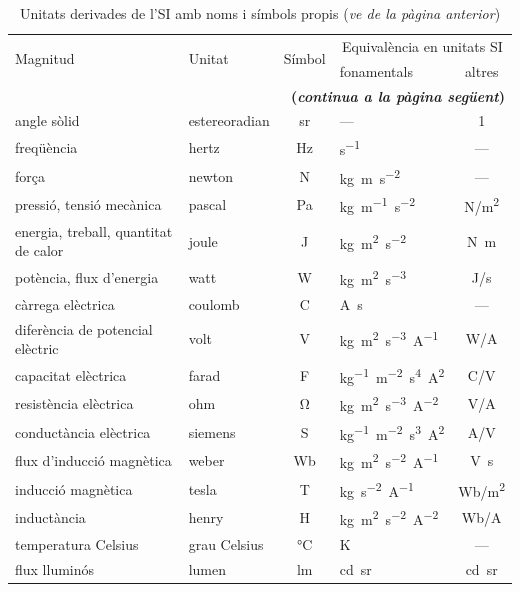 \begin{ThreePartTable}
\begin{longtable}[h]{llclc}
   \midrule
   \endfirsthead
   \caption[]{Unitats derivades de l'SI amb noms i símbols propis (\emph{ve de la pàgina
   anterior})}\\
   \toprule[1pt]
    \multirow{2}{15mm}{\rule{0mm}{6mm}Magnitud} & \multirow{2}{15mm}{\rule{0mm}{6mm}Unitat}  &
    \multirow{2}{15mm}{\rule{0mm}{6mm}Símbol}  & \multicolumn{2}{c}{Equivalència en unitats SI}\\
    \cmidrule(rl){4-5}
    &  &  & fonamentals & altres\\
   \midrule
   \endhead
   \midrule
   \multicolumn{5}{r}{\sffamily\bfseries\color{NavyBlue}(\emph{continua a la pàgina següent})}
   \endfoot
   \insertTableNotes
   \endlastfoot
   angle pla & radian\tnote{\color{blue}(a)} & rad   & --- & 1\\
   angle sòlid & estereoradian\tnote{\color{blue}(b)} & sr & ---  & 1 \\
   freqüència & hertz\tnote{\color{blue}(c)} & Hz & \unit{s^{-1}} & --- \\
   força & newton & N & \unit{kg.m.s^{-2}} & --- \\
   pressió, tensió mecànica & pascal & Pa  & \unit{kg.m^{-1}.s^{-2}} & \unit{N/m^2} \\
   energia, treball, quantitat de calor & joule & J & \unit{kg.m^2.s^{-2}} & \unit{N.m}\\
   potència, flux d'energia & watt & W & \unit{kg.m^2.s^{-3}}  & \unit{J/s}\\
   càrrega elèctrica & coulomb & C  & \unit{A.s} &  ---\\
   diferència de potencial elèctric & volt & V & \unit{kg.m^2.s^{-3}.A^{-1}}  & \unit{W/A}\\
   capacitat elèctrica & farad & F   & \unit{kg^{-1}.m^{-2}.s^4.A^2}& \unit{C/V}\\
   resistència elèctrica & ohm &  \unit{\ohm}  & \unit{kg.m^2.s^{-3}.A^{-2}} & \unit{V/A}\\
   conductància elèctrica & siemens &  S  & \unit{kg^{-1}.m^{-2}.s^3.A^2} & \unit{A/V}\\
   flux d'inducció magnètica & weber &  Wb  & \unit{kg.m^2.s^{-2}.A^{-1}} & \unit{V.s}\\
   inducció magnètica & tesla &  T  & \unit{kg.s^{-2}.A^{-1}} & \unit{Wb/m^2}\\
   inductància & henry &  H  & \unit{kg.m^2.s^{-2}.A^{-2}} & \unit{Wb/A}\\
   temperatura Celsius & grau Celsius &  \unit{\degreeCelsius} & K & --- \\
   flux lluminós & lumen & lm  & \unit{cd.sr}\tnote{\color{blue}(d)} & \unit{cd.sr}\\

\end{longtable}
\end{ThreePartTable}
